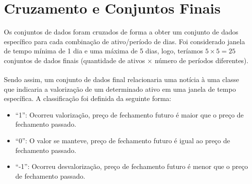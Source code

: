 \documentclass[grad,numbers]{coppe}
\begin{document}
  	\section{Cruzamento e Conjuntos Finais}
  		\paragraph{}Os conjuntos de dados foram cruzados de forma a obter um conjunto de dados específico para cada combinação de ativo/período de dias. Foi considerado janela de tempo mínima de 1 dia e uma máxima de 5 dias, logo, teríamos $5\times5=25$ conjuntos de dados finais (quantidade de ativos $\times$ número de períodos diferentes).
  		\paragraph{}Sendo assim, um conjunto de dados final relacionaria uma notícia à uma classe que indicaria a valorização de um determinado ativo em uma janela de tempo específica. A classificação foi definida da seguinte forma:
 			\begin{itemize}
  			\item ``1'': Ocorreu valorização, preço de fechamento futuro é maior que o preço de fechamento passado.
	 			\item ``0'': O valor se manteve, preço de fechamento futuro é igual ao preço de fechamento passado.
	 			\item ``-1'': Ocorreu desvalorização, preço de fechamento futuro é menor que o preço de fechamento passado.
  		\end{itemize}
\end{document}
